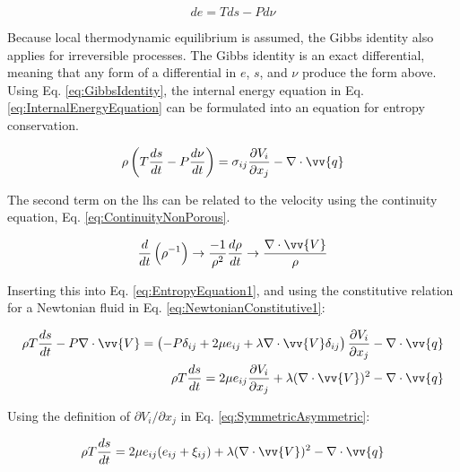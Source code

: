 \documentclass[10pt]{article}
\numberwithin{equation}{section} %
\begin{document}
\begin{equation}
\label{eq:GibbsIdentity}
de=Tds-Pd\nu
\end{equation}

Because local thermodynamic equilibrium is assumed, the Gibbs identity also applies for irreversible processes. The Gibbs identity is an exact differential, meaning that any form of a differential in \(e\), \(s\), and \(\nu\) produce the form above. Using Eq. \eqref{eq:GibbsIdentity}, the internal energy equation in Eq. \eqref{eq:InternalEnergyEquation} can be formulated into an equation for entropy conservation.

\begin{equation}
\label{eq:EntropyEquation1}
\rho\left(T\frac{ds}{dt}-P\frac{d\nu}{dt}\right)=\sigma_{ij}\frac{\partial V_i}{\partial x_j}-\nabla\cdot\vv{q}
\end{equation}

The second term on the \gls{lhs} can be related to the velocity using the continuity equation, Eq. \eqref{eq:ContinuityNonPorous}.

\begin{equation}
\frac{d}{dt}\left(\rho^{-1}\right)\rightarrow\frac{-1}{\rho^2}\frac{d\rho}{dt}\rightarrow\frac{\nabla\cdot\vv{V}}{\rho}
\end{equation}

Inserting this into Eq. \eqref{eq:EntropyEquation1}, and using the constitutive relation for a Newtonian fluid in Eq. \eqref{eq:NewtonianConstitutive1}:

\begin{equation}
\label{eq:EntropyEquation2}
\begin{aligned}
\rho T\frac{ds}{dt}-P\nabla\cdot\vv{V}=\left(-P\delta_{ij}+2\mu e_{ij}+\lambda\nabla\cdot\vv{V}\delta_{ij}\right)\frac{\partial V_i}{\partial x_j}-\nabla\cdot\vv{q}\\
\rho T\frac{ds}{dt}=2\mu e_{ij}\frac{\partial V_i}{\partial x_j}+\lambda(\nabla\cdot\vv{V})^2-\nabla\cdot\vv{q}\\
\end{aligned}
\end{equation}

Using the definition of \(\partial V_i/\partial x_j\) in Eq. \eqref{eq:SymmetricAsymmetric}:

\begin{equation}
\label{eq:EntropyEquation3}
\begin{aligned}
\rho T\frac{ds}{dt}=2\mu e_{ij}(e_{ij}+\xi_{ij})+\lambda(\nabla\cdot\vv{V})^2-\nabla\cdot\vv{q}\\
\end{aligned}
\end{equation}
\end{document}
